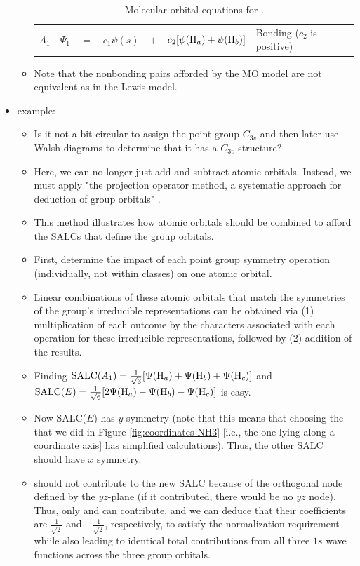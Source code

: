 \documentclass[../notes.tex]{subfiles}
\begin{document}
\begin{itemize}
\begin{itemize}
\begin{table}[h!]
\begin{tabular}{lccccll}
                \rowcolor{grt}
                $A_1$ & $\Psi_1$ & $=$ & $c_1\psi(s)$ & $+$ & $c_2[\psi(\ce{H}_a)+\psi(\ce{H}_b)]$ & Bonding ($c_2$ is positive)\\
            \end{tabular}
            \caption{Molecular orbital equations for .}
            \label{tab:Psi-H2O}
        \end{table}
        \item Note that the nonbonding pairs afforded by the MO model are not equivalent as in the Lewis model.
    \end{itemize}
    \item {} example:
    \begin{itemize}
        \item Is it not a bit circular to assign the point group $C_{3v}$ and then later use Walsh diagrams to determine that it has a $C_{3v}$ structure?
        \item Here, we can no longer just add and subtract atomic orbitals. Instead, we must apply "the projection operator method, a systematic approach for deduction of group orbitals" \parencite[152]{bib:MiesslerFischerTarr}.
        \item This method illustrates how atomic orbitals should be combined to afford the SALCs that define the group orbitals.
        \item First, determine the impact of each point group symmetry operation (individually, not within classes) on one atomic orbital.
        \item Linear combinations of these atomic orbitals that match the symmetries of the group's irreducible representations can be obtained via (1) multiplication of each outcome by the characters associated with each operation for these irreducible representations, followed by (2) addition of the results.
        \item Finding $\text{SALC}(A_1)=\frac{1}{\sqrt{3}}[\Psi(\ce{H}_a)+\Psi(\ce{H}_b)+\Psi(\ce{H}_c)]$ and $\text{SALC}(E)=\frac{1}{\sqrt{6}}[2\Psi(\ce{H}_a)-\Psi(\ce{H}_b)-\Psi(\ce{H}_c)]$ is easy.
        \item Now SALC($E$) has $y$ symmetry (note that this means that choosing the  that we did in Figure \ref{fig:coordinates-NH3} [i.e., the one lying along a coordinate axis] has simplified calculations). Thus, the other SALC should have $x$ symmetry.
        \item {} should not contribute to the new SALC because of the orthogonal node defined by the $yz$-plane (if it contributed, there would be no $yz$ node). Thus, only  and  can contribute, and we can deduce that their coefficients are $\frac{1}{\sqrt{2}}$ and $-\frac{1}{\sqrt{2}}$, respectively, to satisfy the normalization requirement whiile also leading to identical total contributions from all three $1s$ wave functions across the three group orbitals.

\end{itemize}
\end{itemize}
\end{document}
